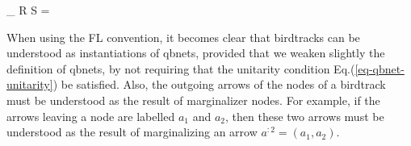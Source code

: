 \beq
\tr_\rvx
R
S 
=
\bcen
{}
\ecen
\eeq

When using the FL convention,
it becomes clear that
birdtracks can
be understood
as instantiations of
qbnets, provided that we
weaken slightly the definition
of qbnets, by
not requiring
that the 
unitarity condition
Eq.(\ref{eq-qbnet-unitarity})
be satisfied. Also,
the outgoing arrows
of the nodes
of a birdtrack
must be understood
as the result of marginalizer nodes.
For example,
if the arrows leaving
a node are labelled $a_1$ and $a_2$,
then
these two arrows
must be understood 
as the result
of marginalizing
an arrow $a^{:2}=(a_1, a_2)$.